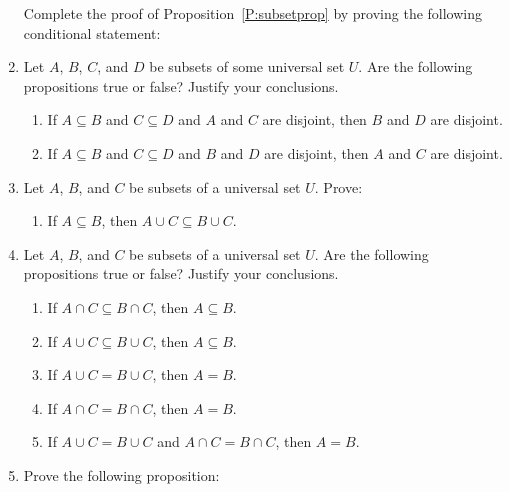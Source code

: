 \begin{enumerate}
\xitem \label{exer:subsetprop} Complete the proof of Proposition~\ref{P:subsetprop} by proving the following conditional statement:


\item Let $A$, $B$, $C$, and $D$ be subsets of some universal set $U$.  Are the following propositions true or false?  Justify your conclusions.
\label{exer:sec42-disjoint}%
\begin{enumerate}
\item If $A \subseteq B$ and $C \subseteq D$ and $A$ and $C$ are disjoint, then $B$ and $D$ are disjoint.
\item If $A \subseteq B$ and $C \subseteq D$ and $B$ and $D$ are disjoint, then $A$ and $C$ are disjoint.
\end{enumerate}


\item Let  $A$, $B$, and  $C$  be subsets of a universal set  $U$. Prove: 
\label{exer:unionandintersect}%
\begin{enumerate}
  \yitem If  $A \subseteq B$, then  $A \cap C \subseteq B \cap C$.
  \item If  $A \subseteq B$, then  $A \cup C \subseteq B \cup C$.
\end{enumerate}


\item Let $A$, $B$, and  $C$  be subsets of a universal set  $U$.  Are the following propositions true or false?  Justify your conclusions.
\label{exer:sec42-unionandintersect}%

\begin{enumerate}
  \item If  $A \cap C \subseteq B \cap C$, then  $A \subseteq B$.
  \item If  $A \cup C \subseteq B \cup C$, then  $A \subseteq B$.
  \item If  $A \cup C = B \cup C$, then $A = B$.
  \item If  $A \cap C = B \cap C$, then $A = B$.
  \item If  $A \cup C = B \cup C$ and $A \cap C = B \cap C$, then $A = B$.
\end{enumerate}


\item Prove the following proposition:


\end{enumerate}
